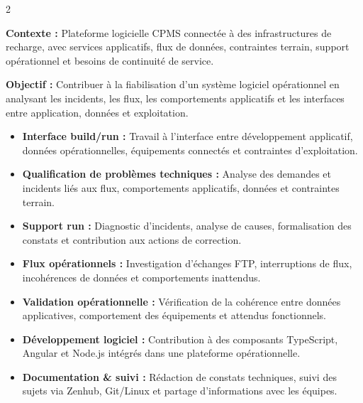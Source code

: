 \documentclass[8pt,a4paper,ragged2e,withhyper]{altacv}
\begin{document}



\makecvheader
\vspace{-0.3cm}


\begin{paracol}{2}



\textbf{Contexte :} Plateforme logicielle CPMS connectée à des infrastructures de recharge, avec services applicatifs, flux de données, contraintes terrain, support opérationnel et besoins de continuité de service.

\textbf{Objectif :} Contribuer à la fiabilisation d’un système logiciel opérationnel en analysant les incidents, les flux, les comportements applicatifs et les interfaces entre application, données et exploitation.

\begin{itemize}
  \item \textbf{Interface build/run :} Travail à l’interface entre développement applicatif, données opérationnelles, équipements connectés et contraintes d’exploitation.
  \item \textbf{Qualification de problèmes techniques :} Analyse des demandes et incidents liés aux flux, comportements applicatifs, données et contraintes terrain.
  \item \textbf{Support run :} Diagnostic d’incidents, analyse de causes, formalisation des constats et contribution aux actions de correction.
  \item \textbf{Flux opérationnels :} Investigation d’échanges FTP, interruptions de flux, incohérences de données et comportements inattendus.
  \item \textbf{Validation opérationnelle :} Vérification de la cohérence entre données applicatives, comportement des équipements et attendus fonctionnels.
  \item \textbf{Développement logiciel :} Contribution à des composants TypeScript, Angular et Node.js intégrés dans une plateforme opérationnelle.
  \item \textbf{Documentation \& suivi :} Rédaction de constats techniques, suivi des sujets via Zenhub, Git/Linux et partage d’informations avec les équipes.
\end{itemize}


\end{paracol}
\end{document}
